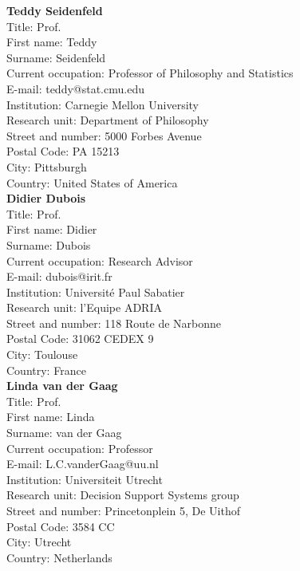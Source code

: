 \documentclass[11pt,dvipsnames,usenames,a4paper]{article}
\begin{document}
\newpage
{\bf Teddy Seidenfeld}\\
Title: Prof.\\
First name: Teddy\\
Surname: Seidenfeld \\
Current occupation: Professor of Philosophy and Statistics\\
E-mail: teddy@stat.cmu.edu\\
Institution: Carnegie Mellon University\\
Research unit: Department of Philosophy\\
Street and number: 5000 Forbes Avenue\\
Postal Code: PA 15213\\
City:  Pittsburgh\\
Country: United States of America\\[-7pt]

{\bf Didier Dubois}\\
Title: Prof.\\
First name: Didier\\
Surname:  Dubois \\
Current occupation: Research Advisor\\
E-mail: dubois@irit.fr\\
Institution: Universit\'e Paul Sabatier\\
Research unit: l'Equipe ADRIA\\
Street and number: 118 Route de Narbonne\\
Postal Code: 31062 CEDEX 9\\
City: Toulouse\\
Country: France\\[-7pt]

{\bf Linda van der Gaag}\\
Title: Prof.\\
First name: Linda\\
Surname:  van der Gaag\\
Current occupation: Professor\\
E-mail: L.C.vanderGaag@uu.nl\\
Institution: Universiteit Utrecht\\
Research unit: Decision Support Systems group\\
Street and number: Princetonplein 5, De Uithof\\
Postal Code: 3584 CC\\
City: Utrecht\\
Country: Netherlands\\[-7pt]
\end{document}
